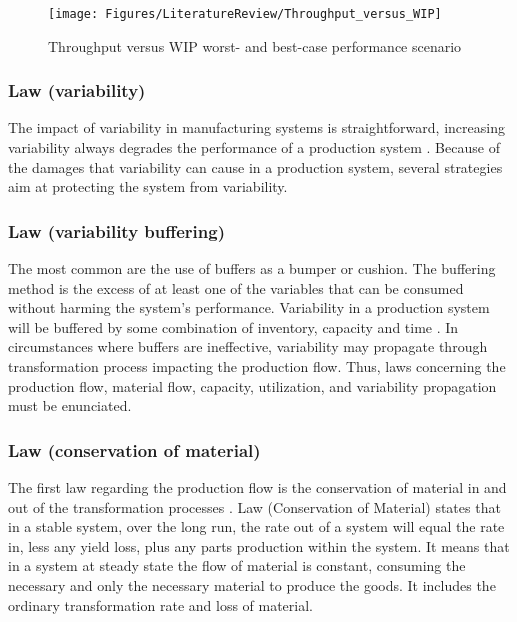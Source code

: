 \documentclass{article}
\begin{document}
\begin{figure}[H]
  \centering
  \texttt{[image: Figures/LiteratureReview/Throughput\_versus\_WIP]}
  \caption{Throughput versus WIP worst- and best-case performance scenario}\label{fig:throughput versus WIP worst- and best-case performance scenario}
\end{figure}

\subsubsection{Law (variability)}
\label{sec:org5944cd4}

The impact of variability in manufacturing systems is straightforward, increasing variability always degrades the performance of a production system \citep{Hopp2001}.
Because of the damages that variability can cause in a production system, several strategies aim at protecting the system from variability.

\subsubsection{Law (variability buffering)}
\label{sec:org2f48122}

The most common are the use of buffers as a bumper or cushion.
The buffering method is the excess of at least one of the variables that can be consumed without harming the system's performance.
Variability in a production system will be buffered by some combination of inventory, capacity and time \citep{Hopp2001}.
In circumstances where buffers are ineffective, variability may propagate through transformation process impacting the production flow.
Thus, laws concerning the production flow, material flow, capacity, utilization, and variability propagation must be enunciated.

\subsubsection{Law (conservation of material)}
\label{sec:org9efc44c}

The first law regarding the production flow is the conservation of material in and out of the transformation processes \citep{Hopp2001}.
Law (Conservation of Material) states that in a stable system, over the long run, the rate out of a system will equal the rate in, less any yield loss, plus any parts production within the system.
It means that in a system at steady state the flow of material is constant, consuming the necessary and only the necessary material to produce the goods.
It includes the ordinary transformation rate and loss of material.
\end{document}
